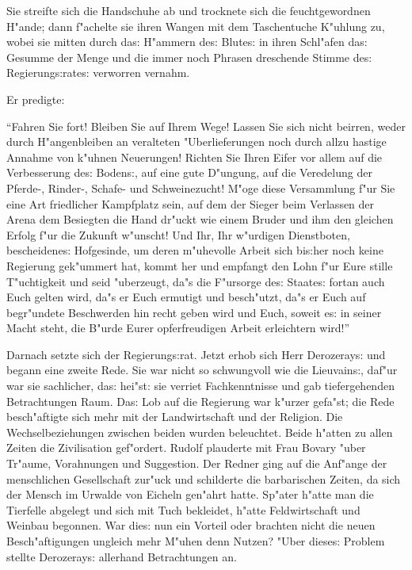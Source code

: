 \documentclass[oneside,12pt]{book}
\newcommand{\s}{s:}%
\begin{document}
Sie streifte sich die Handschuhe ab und trocknete sich die
feuchtgewordnen H"ande; dann f"achelte sie ihren Wangen mit dem
Taschentuche K"uhlung zu, wobei sie mitten durch da{\s} H"ammern
de{\s} Blute{\s} in ihren Schl"afen da{\s} Gesumme der Menge und
die immer noch Phrasen dreschende Stimme de{\s}
Regierung{\s}rate{\s} verworren vernahm.

Er predigte:

"`Fahren Sie fort! Bleiben Sie auf Ihrem Wege! Lassen Sie sich
nicht beirren, weder durch H"angenbleiben an veralteten
"Uberlieferungen noch durch allzu hastige Annahme von k"uhnen
Neuerungen! Richten Sie Ihren Eifer vor allem auf die Verbesserung
de{\s} Boden{\s}, auf eine gute D"ungung, auf die Veredelung der
Pferde-, Rinder-, Schafe- und Schweinezucht! M"oge diese
Versammlung f"ur Sie eine Art friedlicher Kampfplatz sein, auf dem
der Sieger beim Verlassen der Arena dem Besiegten die Hand dr"uckt
wie einem Bruder und ihm den gleichen Erfolg f"ur die Zukunft
w"unscht! Und Ihr, Ihr w"urdigen Dienstboten, bescheidene{\s}
Hofgesinde, um deren m"uhevolle Arbeit sich bi{\s}her noch keine
Regierung gek"ummert hat, kommt her und empfangt den Lohn f"ur
Eure stille T"uchtigkeit und seid "uberzeugt, da"s die F"ursorge
de{\s} Staate{\s} fortan auch Euch gelten wird, da"s er Euch
ermutigt und besch"utzt, da"s er Euch auf begr"undete Beschwerden
hin recht geben wird und Euch, soweit e{\s} in seiner Macht steht,
die B"urde Eurer opferfreudigen Arbeit erleichtern wird!"'

Darnach setzte sich der Regierung{\s}rat. Jetzt erhob sich Herr
Derozeray{\s} und begann eine zweite Rede. Sie war nicht so
schwungvoll wie die Lieuvain{\s}, daf"ur war sie sachlicher,
da{\s} hei"st: sie verriet Fachkenntnisse und gab tiefergehenden
Betrachtungen Raum. Da{\s} Lob auf die Regierung war k"urzer
gefa"st; die Rede besch"aftigte sich mehr mit der Landwirtschaft
und der Religion. Die Wechselbeziehungen zwischen beiden wurden
beleuchtet. Beide h"atten zu allen Zeiten die Zivilisation
gef"ordert. Rudolf plauderte mit Frau Bovary "uber Tr"aume,
Vorahnungen und Suggestion. Der Redner ging auf die Anf"ange der
menschlichen Gesellschaft zur"uck und schilderte die barbarischen
Zeiten, da sich der Mensch im Urwalde von Eicheln gen"ahrt hatte.
Sp"ater h"atte man die Tierfelle abgelegt und sich mit Tuch
bekleidet, h"atte Feldwirtschaft und Weinbau begonnen. War die{\s}
nun ein Vorteil oder brachten nicht die neuen Besch"aftigungen
ungleich mehr M"uhen denn Nutzen? "Uber diese{\s} Problem stellte
Derozeray{\s} allerhand Betrachtungen an.
\end{document}
